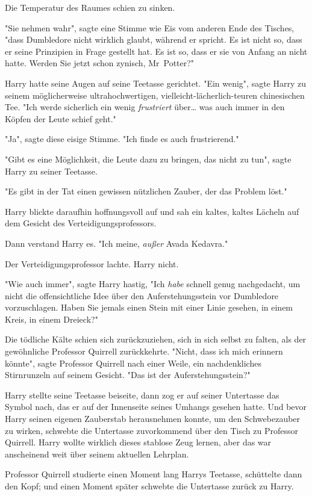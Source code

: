 {Die Temperatur des Raumes schien zu sinken.

"Sie nehmen wahr", sagte eine Stimme wie Eis vom anderen Ende des Tisches, "dass Dumbledore nicht wirklich glaubt, während er spricht. Es ist nicht so, dass er seine Prinzipien in Frage gestellt hat. Es ist so, dass er sie von Anfang an nicht hatte. Werden Sie jetzt schon zynisch, Mr~Potter?"

Harry hatte seine Augen auf seine Teetasse gerichtet. "Ein wenig", sagte Harry zu seinem möglicherweise ultrahochwertigen, vielleicht-lächerlich-teuren chinesischen Tee. "Ich werde sicherlich ein wenig \emph{frustriert} über… was auch immer in den Köpfen der Leute schief geht."

"Ja", sagte diese eisige Stimme. "Ich finde es auch frustrierend."

"Gibt es eine Möglichkeit, die Leute dazu zu bringen, das nicht zu tun", sagte Harry zu seiner Teetasse.

"Es gibt in der Tat einen gewissen nützlichen Zauber, der das Problem löst."

Harry blickte daraufhin hoffnungsvoll auf und sah ein kaltes, kaltes Lächeln auf dem Gesicht des Verteidigungsprofessors.

Dann verstand Harry es. "Ich meine, \emph{außer} Avada Kedavra."

Der Verteidigungsprofessor lachte. Harry nicht.

"Wie auch immer", sagte Harry hastig, "Ich \emph{habe} schnell genug nachgedacht, um nicht die offensichtliche Idee über den Auferstehungsstein vor Dumbledore vorzuschlagen. Haben Sie jemals einen Stein mit einer Linie gesehen, in einem Kreis, in einem Dreieck?"

Die tödliche Kälte schien sich zurückzuziehen, sich in sich selbst zu falten, als der gewöhnliche Professor Quirrell zurückkehrte. "Nicht, dass ich mich erinnern könnte", sagte Professor Quirrell nach einer Weile, ein nachdenkliches Stirnrunzeln auf seinem Gesicht. "Das ist der Auferstehungsstein?"

Harry stellte seine Teetasse beiseite, dann zog er auf seiner Untertasse das Symbol nach, das er auf der Innenseite seines Umhangs gesehen hatte. Und bevor Harry seinen eigenen Zauberstab herausnehmen konnte, um den Schwebezauber zu wirken, schwebte die Untertasse zuvorkommend über den Tisch zu Professor Quirrell. Harry wollte wirklich dieses stablose Zeug lernen, aber das war anscheinend weit über seinem aktuellen Lehrplan.

Professor Quirrell studierte einen Moment lang Harrys Teetasse, schüttelte dann den Kopf; und einen Moment später schwebte die Untertasse zurück zu Harry.

}
